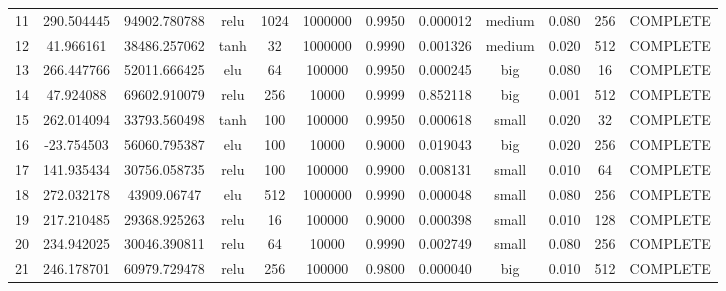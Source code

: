 \begin{longtable}{cccccccccccc}
                       11 &                 290.504445 &                       94902.780788 &            relu &        1024 &      1000000 & 0.9950 &       0.000012 &    medium & 0.080 &         256 & COMPLETE \\
                       12 &                  41.966161 &                       38486.257062 &            tanh &          32 &      1000000 & 0.9990 &       0.001326 &    medium & 0.020 &         512 & COMPLETE \\
                       13 &                 266.447766 &                       52011.666425 &             elu &          64 &       100000 & 0.9950 &       0.000245 &       big & 0.080 &          16 & COMPLETE \\
                       14 &                  47.924088 &                       69602.910079 &            relu &         256 &        10000 & 0.9999 &       0.852118 &       big & 0.001 &         512 & COMPLETE \\
                       15 &                 262.014094 &                       33793.560498 &            tanh &         100 &       100000 & 0.9950 &       0.000618 &     small & 0.020 &          32 & COMPLETE \\
                       16 &                 -23.754503 &                       56060.795387 &             elu &         100 &        10000 & 0.9000 &       0.019043 &       big & 0.020 &         256 & COMPLETE \\
                       17 &                 141.935434 &                       30756.058735 &            relu &         100 &       100000 & 0.9900 &       0.008131 &     small & 0.010 &          64 & COMPLETE \\
                       18 &                 272.032178 &                        43909.06747 &             elu &         512 &      1000000 & 0.9990 &       0.000048 &     small & 0.080 &         256 & COMPLETE \\
                       19 &                 217.210485 &                       29368.925263 &            relu &          16 &       100000 & 0.9000 &       0.000398 &     small & 0.010 &         128 & COMPLETE \\
                       20 &                 234.942025 &                       30046.390811 &            relu &          64 &        10000 & 0.9990 &       0.002749 &     small & 0.080 &         256 & COMPLETE \\
                       21 &                 246.178701 &                       60979.729478 &            relu &         256 &       100000 & 0.9800 &       0.000040 &       big & 0.010 &         512 & COMPLETE \\

\end{longtable}

